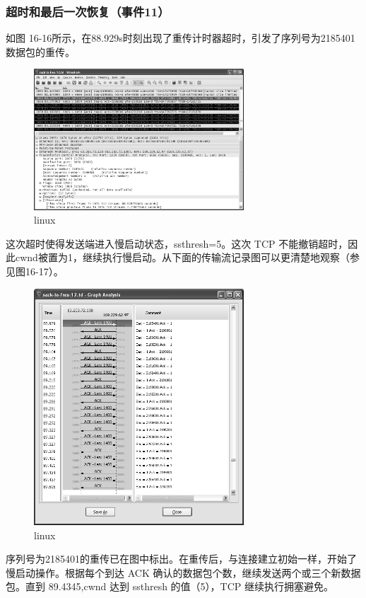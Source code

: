 \subsubsection{超时和最后一次恢复（事件11）}
如图 16-16所示，在88.929s时刻出现了重传计时器超时，引发了序列号为2185401数据包的重传。
\begin{figure}[!htb]
    \centering
	\includegraphics[width=0.7\textwidth]{imgs/16/16-16.png}
	\caption{linux}
\end{figure}
这次超时使得发送端进入慢启动状态，ssthresh=5。这次 TCP 不能撤销超时，因此cwnd被置为1，继续执行慢启动。从下面的传输流记录图可以更清楚地观察（参见图16-17）。
\begin{figure}[!htb]
    \centering
	\includegraphics[width=0.7\textwidth]{imgs/16/16-17.png}
	\caption{linux}
\end{figure}
序列号为2185401的重传已在图中标出。在重传后，与连接建立初始一样，开始了慢启动操作。根据每个到达 ACK 确认的数据包个数，继续发送两个或三个新数据包。直到
89.4345,cwnd 达到 ssthresh 的值（5），TCP 继续执行拥塞避免。

